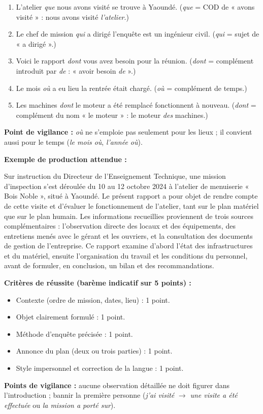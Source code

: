 \documentclass[11pt]{article}
\begin{document}
\begin{corrige}
\begin{enumerate}
    \item L'atelier \emph{que} nous avons visité se trouve à Yaoundé. (\emph{que} = COD de « avons visité » : nous avons visité \emph{l'atelier}.)
    \item Le chef de mission \emph{qui} a dirigé l'enquête est un ingénieur civil. (\emph{qui} = sujet de « a dirigé ».)
    \item Voici le rapport \emph{dont} vous avez besoin pour la réunion. (\emph{dont} = complément introduit par \emph{de} : « avoir besoin \emph{de} ».)
    \item Le mois \emph{où} a eu lieu la rentrée était chargé. (\emph{où} = complément de temps.)
    \item Les machines \emph{dont} le moteur a été remplacé fonctionnent à nouveau. (\emph{dont} = complément du nom « le moteur » : le moteur \emph{des} machines.)
\end{enumerate}
\textbf{Point de vigilance :} \emph{où} ne s'emploie pas seulement pour les lieux ; il convient aussi pour le temps (\emph{le mois où}, \emph{l'année où}).
\end{corrige}

\begin{corrige}
\textbf{Exemple de production attendue :}

Sur instruction du Directeur de l'Enseignement Technique, une mission d'inspection s'est déroulée du 10 au 12 octobre 2024 à l'atelier de menuiserie « Bois Noble », situé à Yaoundé. Le présent rapport a pour objet de rendre compte de cette visite et d'évaluer le fonctionnement de l'atelier, tant sur le plan matériel que sur le plan humain. Les informations recueillies proviennent de trois sources complémentaires : l'observation directe des locaux et des équipements, des entretiens menés avec le gérant et les ouvriers, et la consultation des documents de gestion de l'entreprise. Ce rapport examine d'abord l'état des infrastructures et du matériel, ensuite l'organisation du travail et les conditions du personnel, avant de formuler, en conclusion, un bilan et des recommandations.

\textbf{Critères de réussite (barème indicatif sur 5 points) :}
\begin{itemize}
    \item Contexte (ordre de mission, dates, lieu) : 1 point.
    \item Objet clairement formulé : 1 point.
    \item Méthode d'enquête précisée : 1 point.
    \item Annonce du plan (deux ou trois parties) : 1 point.
    \item Style impersonnel et correction de la langue : 1 point.
\end{itemize}
\textbf{Points de vigilance :} aucune observation détaillée ne doit figurer dans l'introduction ; bannir la première personne (\emph{j'ai visité} $\rightarrow$ \emph{une visite a été effectuée} ou \emph{la mission a porté sur}).
\end{corrige}
\end{document}

